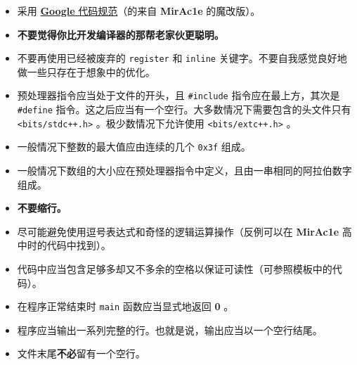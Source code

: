\begin{itemize}
    \item 采用 \href{https://zh-google-styleguide.readthedocs.io}{\textbf{Google} 代码规范}（的来自 \textbf{MirAc1e} 的魔改版）。
    \item \textbf{不要觉得你比开发编译器的那帮老家伙更聪明。}
    \item 不要再使用已经被废弃的 \texttt{register} 和 \texttt{inline} 关键字。不要自我感觉良好地做一些只存在于想象中的优化。
    \item 预处理器指令应当处于文件的开头，且 \texttt{#include} 指令应在最上方，其次是 \texttt{#define} 指令。这之后应当有一个空行。大多数情况下需要包含的头文件只有 \texttt{<bits/stdc++.h>} 。极少数情况下允许使用 \texttt{<bits/extc++.h>} 。
    \item 一般情况下整数的最大值应由连续的几个 \texttt{0x3f} 组成。
    \item 一般情况下数组的大小应在预处理器指令中定义，且由一串相同的阿拉伯数字组成。
    \item \textbf{不要缩行。}
    \item 尽可能避免使用逗号表达式和奇怪的逻辑运算操作（反例可以在 \textbf{MirAc1e} 高中时的代码中找到）。
    \item 代码中应当包含足够多却又不多余的空格以保证可读性（可参照模板中的代码）。
    \item 在程序正常结束时 \texttt{main} 函数应当显式地返回 \textbf{0} 。
    \item 程序应当输出一系列完整的行。也就是说，输出应当以一个空行结尾。
    \item 文件末尾\textbf{不必}留有一个空行。
\end{itemize}